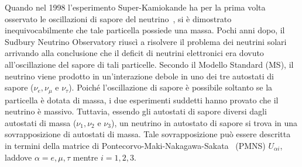 

Quando nel 1998 l'esperimento Super-Kamiokande ha per la prima volta osservato le oscillazioni di sapore del neutrino~\cite{fukuda:prl98}, si è dimostrato inequivocabilmente che tale particella possiede una massa. 
Pochi anni dopo, il Sudbury Neutrino Observatory riuscì a risolvere il problema dei neutrini solari arrivando alla conclusione che il deficit di neutrini elettronici era dovuto all'oscillazione del sapore di tali particelle.
Secondo il Modello Standard (MS), il neutrino viene prodotto in un'interazione debole in uno dei tre autostati di sapore ($\nu_e, \nu_{\mu} \mbox{ e }  \nu_{\tau}$).
Poiché l'oscillazione di sapore è possibile soltanto se la particella è dotata di massa, i due esperimenti suddetti hanno provato che il neutrino è massivo. 
Tuttavia, essendo gli autostati di sapore diversi dagli autostati di massa ($\nu_1, \nu_{2} \mbox{ e }  \nu_{3}$), un neutrino in autostato di sapore si trova in una sovrapposizione di autostati di massa.
Tale sovrapposizione può essere descritta in termini della matrice di Pontecorvo-Maki-Nakagawa-Sakata~\cite{maki:ptp62} (PMNS) $U_{\alpha i}$, laddove $\alpha = e, \mu, \tau $ mentre $ i = 1, 2, 3 $.


